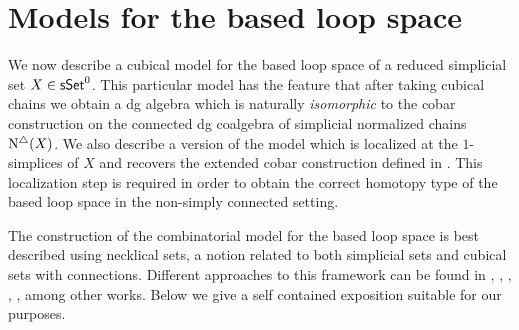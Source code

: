 \section{Models for the based loop space}

We now describe a cubical model for the based loop space of a reduced simplicial set $X \in \mathsf{sSet}^0$. This particular model has the feature that after taking cubical chains we obtain a dg algebra which is naturally \textit{isomorphic} to the cobar construction on the connected dg coalgebra of simplicial normalized chains $\operatorname{N^{\triangle}}(X)$. We also describe a version of the model which is localized at the $1$-simplices of $X$ and recovers the extended cobar construction defined in \cite{hess2010cobar}. This localization step is required in order to obtain the correct homotopy type of the based loop space in the non-simply connected setting.

The construction of the combinatorial model for the based loop space is best described using necklical sets, a notion related to both simplicial sets and cubical sets with connections. Different approaches to this framework can be found in \cite{baues1998hopf}, \cite{galvez2020hopf}, \cite{dugger2011rigidification}, \cite{rivera2018cubical}, \cite{rivera2018cubical}, among other works. Below we give a self contained exposition suitable for our purposes. 




